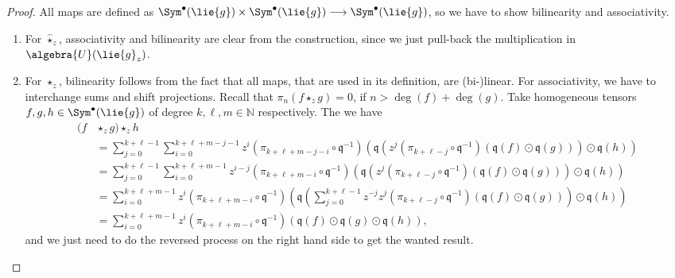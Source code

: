 \begin{proof}
  All maps are defined as $\Sym^{\bullet}(\lie{g}) \times \Sym^{\bullet}
  (\lie{g}) \longrightarrow \Sym^{\bullet}(\lie{g})$, so we have to show 
  bilinearity and associativity.
  \begin{enumerate}
	\item 
	For $\widehat{\star}_z$, associativity and bilinearity are clear from the 
	construction, since we just pull-back the multiplication in $\algebra{U}
	(\lie{g}_z)$.
	
	\item
	For $\star_z$, bilinearity follows from the fact that all maps, that are 
	used in its definition, are (bi-)linear. For associativity, we have to 
	interchange sums and shift projections.
	Recall that $\pi_n(f \star_z g) = 0$, if $n > \deg(f) + \deg(g)$.
	Take homogeneous tensors $f, g, h \in \Sym^{\bullet}(\lie{g})$
	of degree $k, \ell, m \in \mathbb{N}$ respectively. The we have
	\begin{align*}
		\big(
			f 
		&
			\star_z g
		\big)
		\star_z
		h
		\\
		& =
		\sum\limits_{j=0}^{k + \ell -1}
		\sum\limits_{i = 0}^{k + \ell + m -j - 1}
		z^i
		\left( 
			\pi_{k + \ell + m - j - i} 
			\circ 
			\mathfrak{q}^{-1}
		\right)
		\left(
			\mathfrak{q}
			\left(
				z^j
				\left(
					\pi_{k + \ell - j} 
					\circ 
					\mathfrak{q}^{-1}
				\right)
				\left(
					\mathfrak{q} (f) 
					\odot
					\mathfrak{q} (g)
				\right)
			\right)
			\odot
			\mathfrak{q}(h)
		\right)
		\\
		& =
		\sum\limits_{j=0}^{k + \ell -1}
		\sum\limits_{i = 0}^{k + \ell + m - 1}
		z^{i-j}
		\left( 
			\pi_{k + \ell + m - i} 
			\circ 
			\mathfrak{q}^{-1}
		\right)
		\left(
			\mathfrak{q}
			\left(
				z^j
				\left(
					\pi_{k + \ell - j} 
					\circ 
					\mathfrak{q}^{-1}
				\right)
				\left(
					\mathfrak{q} (f)
					\odot
					\mathfrak{q} (g)
				\right)
			\right)
			\odot
			\mathfrak{q}(h)
		\right)
		\\
		& =
		\sum\limits_{i = 0}^{k + \ell + m - 1}
		z^i
		\left( 
			\pi_{k + \ell + m - i} 
			\circ 
			\mathfrak{q}^{-1}
		\right)
		\left(
			\mathfrak{q}
			\left(
				\sum\limits_{j=0}^{k + \ell -1}
				z^{-j}
				z^j
				\left(
					\pi_{k + \ell - j} 
					\circ 
					\mathfrak{q}^{-1}
				\right)
				\left(
					\mathfrak{q} (f)
					\odot
					\mathfrak{q} (g)
				\right)
			\right)
			\odot
			\mathfrak{q}(h)
		\right)
		\\
		& =
		\sum\limits_{i = 0}^{k + \ell + m - 1}
		z^i
		\left( 
			\pi_{k + \ell + m - i} 
			\circ 
			\mathfrak{q}^{-1}
		\right)
		\left(
			\mathfrak{q}(f)
			\odot
			\mathfrak{q}(g)
			\odot
			\mathfrak{q}(h)
		\right),
	\end{align*}
	and we just need to do the reversed process on the right hand side to get 
	the wanted result.
	

\end{enumerate}
\end{proof}
